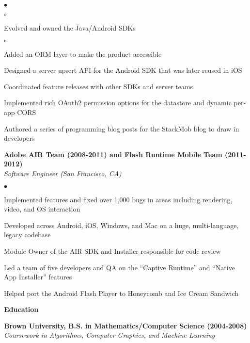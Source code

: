 \documentclass[ComputerScience]{vita}
\newcommand{\CPP}
{C\nolinebreak[4]\hspace{-.05em}\raisebox{.60ex}{\tiny\bf ++}}
\newenvironment{suber}[0]
{\begin{list}{$\bullet$}
	{\setlength{\topsep}{-0.4in}
		\setlength{\leftmargin}{0.25in}
		\setlength{\itemsep}{0.01in}}
}
{\end{list}\par}
\newenvironment{suberb}[0]
{\begin{list}{$\circ$}
	{\setlength{\topsep}{-0.4in}
		\setlength{\leftmargin}{0.25in}
		\setlength{\itemsep}{0.01in}}
}
{\end{list}\par}
\begin{document}
\begin{vita}
\begin{list}{}{\setlength{\leftmargin}{.25in}}
\begin{suber}
\begin{suberb}
		\end{suberb}
	\item Evolved and owned the Java/Android SDKs
		\begin{suberb}
    	    \item Added an ORM layer to make the product accessible
			\item Designed a server upsert API for the Android SDK that was later reused in iOS
			\item Coordinated feature releases with other SDKs and server teams
		\end{suberb}
	\item Implemented rich OAuth2 permission options for the datastore and dynamic per-app CORS
	\item Authored a series of programming blog posts for the StackMob blog to draw in developers
    \end{suber}
    \item {\bf Adobe AIR Team (2008-2011) and Flash Runtime Mobile Team (2011-2012)}\\
    {\em Software Engineer (San Francisco, CA)}
    \begin{suber}
	\item Implemented features and fixed over 1,000 bugs in areas including rendering, video, and OS interaction 
	\item Developed across  Android, iOS, Windows, and Mac on a huge, multi-language, legacy codebase
	\item Module Owner of the AIR SDK and Installer responsible for code review
	\item Led a team of five developers and QA on the ``Captive Runtime'' and ``Native App Installer'' features
	\item Helped port the Android Flash Player to Honeycomb and Ice Cream Sandwich
    \end{suber}
\end{list}
{\bf {\large Education}}\ \hrulefill
\begin{list}{}{\setlength{\leftmargin}{.25in}}
\item {\bf Brown University,
	B.S. in Mathematics/Computer Science (2004-2008)}\\
	{\em Coursework in Algorithms, Computer Graphics, and Machine Learning }
\end{list}
\end{vita}
\end{document}
